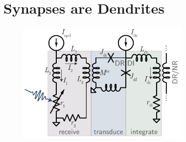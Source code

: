 \documentclass[twocolumn]{article}
\begin{document}





\section{\label{sec:synapses}Synapses are Dendrites}
\begin{figure}[h!]
\includegraphics[width=8.6cm]{figures/_fig__synapses__circuit.pdf}
\end{figure}


\end{document}
